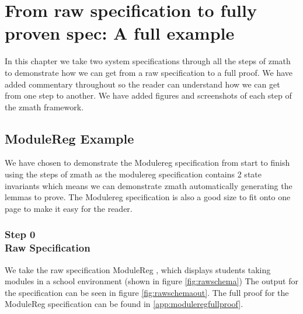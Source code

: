 \chapter{From raw specification to fully proven spec: A full example}
\label{ch:fullexample}

In this chapter we take two system specifications through all the steps of
\gls{zmath} to demonstrate how we can get from a raw specification to a full
proof. We have added commentary throughout so the reader can understand how we
can get from one step to another. We have added figures and screenshots of each
step of the \gls{zmath} framework.

\section{ModuleReg Example}
We have chosen to demonstrate the Modulereg specification from start to finish
using the steps of \gls{zmath} as the modulereg specification contains 2 state
invariants which means we can demonstrate \gls{zmath} automatically generating
the lemmas to prove. The  Modulereg specification is also a good size to fit
onto one page to make it easy for the reader.

\subsection{Step 0\\Raw Specification}
We take the raw specification ModuleReg \cite{essenceofz}, which displays students
taking modules in a school environment (shown in figure \ref{fig:rawschema}) The
output for the specification can be seen in figure \ref{fig:rawschemaout}. The
full proof for the ModuleReg specification can be found in \ref{app:moduleregfullproof}.

